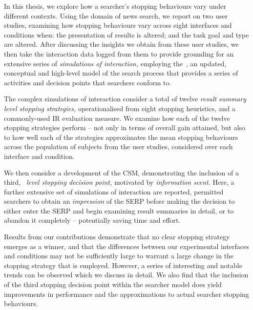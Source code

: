 \begin{preamble}
In this thesis, we explore how a searcher's stopping behaviours vary under different contexts. Using the domain of news search, we report on two user studies, examining how stopping behaviours vary across eight interfaces and conditions when: the presentation of results is altered; and the task goal and type are altered. After discussing the insights we obtain from these user studies, we then take the interaction data logged from them to provide grounding for an extensive series of \emph{simulations of interaction,} employing the~, an updated, conceptual and high-level model of the search process that provides a series of activities and decision points that searchers conform to.

The complex simulations of interaction consider a total of twelve \emph{result summary level stopping strategies,} operationalised from eight stopping heuristics, and a commonly-used IR evaluation measure. We examine how each of the twelve stopping strategies perform -- not only in terms of overall gain attained, but also to how well each of the strategies approximates the mean stopping behaviours across the population of subjects from the user studies, considered over each interface and condition.

We then consider a development of the CSM, demonstrating the inclusion of a third,~ \emph{level stopping decision point,} motivated by \emph{information scent.} Here, a further extensive set of simulations of interaction are reported, permitted searchers to obtain an \emph{impression} of the SERP before making the decision to either enter the SERP and begin examining result summaries in detail, or to abandon it completely -- potentially saving time and effort.

Results from our contributions demonstrate that no clear stopping strategy emerges as a winner, and that the differences between our experimental interfaces and conditions may not be sufficiently large to warrant a large change in the stopping strategy that is employed. However, a series of interesting and notable trends can be observed which we discuss in detail. We also find that the inclusion of the third stopping decision point within the searcher model does yield improvements in performance and the approximations to actual searcher stopping behaviours.





\end{preamble}

